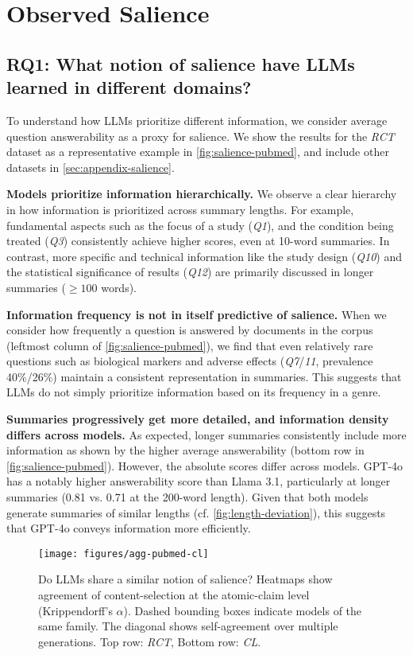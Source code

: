 \section{Observed Salience}
\subsection{RQ1: What notion of salience have LLMs learned in different domains?}
\label{sec:results-salience}
To understand how LLMs prioritize different information, we consider average question answerability as a proxy for salience. We show the results for the \emph{RCT} dataset as a representative example in \cref{fig:salience-pubmed}, and include other datasets in \cref{sec:appendix-salience}.

\textbf{Models prioritize information hierarchically.}
We observe a clear hierarchy in how information is prioritized across summary lengths.
For example, fundamental aspects such as the focus of a study (\emph{Q1}), and the condition being treated (\emph{Q3}) consistently achieve higher scores, even at 10-word summaries.
In contrast, more specific and technical information like the study design (\emph{Q10}) and the statistical significance of results (\emph{Q12}) are primarily discussed in longer summaries ($\ge 100$ words).

\textbf{Information frequency is not in itself predictive of salience.}
When we consider how frequently a question is answered by documents in the corpus (leftmost column of \cref{fig:salience-pubmed}), we find that even relatively rare questions such as biological markers and adverse effects (\emph{Q7}/\emph{11}, prevalence 40\%/26\%) maintain a consistent representation in summaries.
This suggests that LLMs do not simply prioritize information based on its frequency in a genre.

\textbf{Summaries progressively get more detailed, and information density differs across models.}
As expected, longer summaries consistently include more information as shown by the higher average answerability (bottom row in \cref{fig:salience-pubmed}).
However, the absolute scores differ across models.
GPT-4o has a notably higher answerability score than Llama 3.1, particularly at longer summaries (0.81 vs. 0.71 at the 200-word length).
Given that both models generate summaries of similar lengths (cf. \cref{fig:length-deviation}), this suggests that GPT-4o conveys information more efficiently.

\begin{figure*}[t]
\texttt{[image: figures/agg-pubmed-cl]}
\caption{
    Do LLMs share a similar notion of salience?
    Heatmaps show agreement of content-selection at the atomic-claim level (Krippendorff's $\alpha$).
    Dashed bounding boxes indicate models of the same family.
    The diagonal shows self-agreement over multiple generations. Top row: \emph{RCT}, Bottom row: \emph{CL}.
}
\label{fig:agg-pubmed-cl}
\end{figure*}

